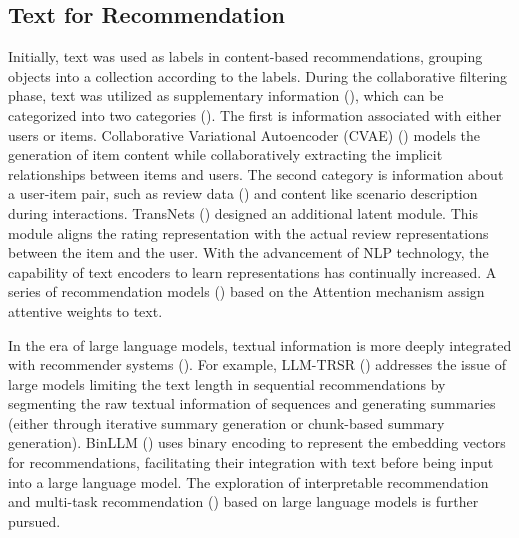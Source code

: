 \subsection{Text for Recommendation}Initially, text was used as labels in content-based recommendations, grouping objects into a collection according to the labels. During the collaborative filtering phase, text was utilized as supplementary information (\cite{kim2016convolutional}), which can be categorized into two categories (\cite{wu2022survey}). The first is information associated with either users or items. Collaborative Variational Autoencoder (CVAE) (\cite{li2017collaborative}) models the generation of item content while collaboratively extracting the implicit relationships between items and users. The second category is information about a user-item pair, such as review data (\cite{zheng2017joint}) and content like scenario description during interactions. TransNets (\cite{catherine2017transnets}) designed an additional latent module. This module aligns the rating representation with the actual review representations between the item and the user. With the advancement of NLP technology, the capability of text encoders to learn representations has continually increased. A series of recommendation models (\cite{zhang2022dynamic,zhu2019dan,wu2019npa}) based on the Attention mechanism assign attentive weights to text. 

In the era of large language models, textual information is more deeply integrated with recommender systems (\cite{gao2023chat,li2023gpt4rec,friedman2023leveraging}). For example, LLM-TRSR (\cite{zheng2024harnessing}) addresses the issue of large models limiting the text length in sequential recommendations by segmenting the raw textual information of sequences and generating summaries (either through iterative summary generation or chunk-based summary generation).  BinLLM (\cite{zhang2024text}) uses binary encoding to represent the embedding vectors for recommendations, facilitating their integration with text before being input into a large language model. The exploration of interpretable recommendation and multi-task recommendation (\cite{geng2022recommendation}) based on large language models is further pursued.